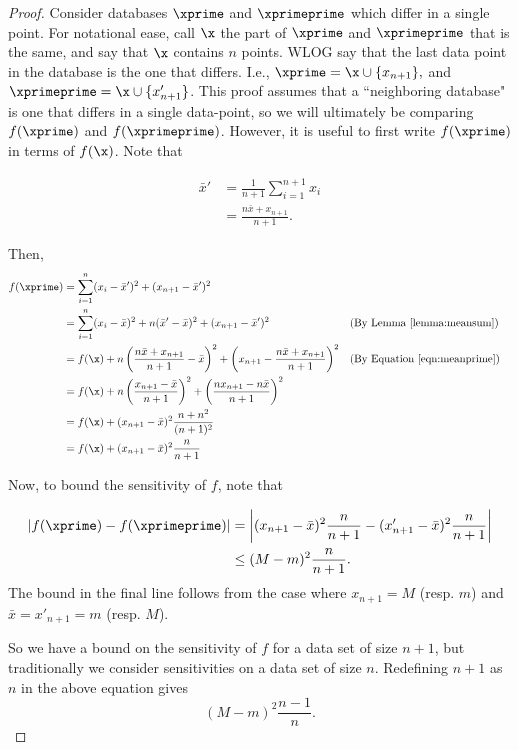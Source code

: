 \documentclass[11pt]{scrartcl} %
\begin{document}
\begin{proof}
Consider databases $\xprime$ and $\xprimeprime$ which differ in a single point. For notational ease, call $\x$ the part of $\xprime$ and $\xprimeprime$
that is the same, and say that $\x$ contains $n$ points. WLOG say that the last data point in the database is the one that differs. I.e.,
$\xprime = \x \cup \{x_{n+1}\},$ and $\xprimeprime = \x \cup \{x'_{n+1}\}$. This proof assumes that a ``neighboring database" is one that differs in a single
data-point, so we will ultimately be comparing $f(\xprime)$ and $f(\xprimeprime)$. However, it is useful to first write $f(\xprime)$ in terms of $f(\x)$.
Note that

\begin{align}
\label{eqn:meanprime}
\bar{x}' &= \frac{1}{n+1} \sum_{i=1}^{n+1} x_i \nonumber \\
	&= \frac{n\bar{x} + x_{n+1}}{n+1}.
\end{align}

Then,
\begin{align}
\label{eq:varAddOnePoint}
f(\xprime) &= \sum_{i=1}^n (x_i - \bar{x}')^2 + (x_{n+1} - \bar{x}')^2 \notag\\
	&= \sum_{i=1}^n (x_i - \bar{x})^2 + n(\bar{x}'-\bar{x})^2 + (x_{n+1} - \bar{x}')^2 &&\text{(By Lemma \ref{lemma:meansum})} \notag\\
	&= f(\x) + n\left( \frac{n\bar{x} + x_{n+1}}{n+1}-\bar{x}\right)^2 + \left(x_{n+1} - \frac{n\bar{x} + x_{n+1}}{n+1} \right)^2 &&\text{(By Equation \ref{eqn:meanprime})} \notag\\
	&= f(\x) + n\left(\frac{x_{n+1}-\bar{x}}{n+1}\right)^2 + \left( \frac{nx_{n+1}-n\bar{x}}{n+1}\right)^2 \notag\\
	&= f(\x) + (x_{n+1}-\bar{x})^2 \frac{n+n^2}{(n+1)^2} \notag\\
	&= f(\x) + (x_{n+1}-\bar{x})^2 \frac{n}{n+1} \notag\\
\end{align}

Now, to bound the sensitivity of $f$, note that

\begin{align}
	\label{eq:l1_np1_bound}
\left\vert f(\xprime) - f(\xprimeprime) \right\vert &= \left\vert (x_{n+1}-\bar{x})^2 \frac{n}{n+1} - (x_{n+1}'-\bar{x})^2 \frac{n}{n+1} \right\vert \\
	&\le (M-m)^2 \frac{n}{n+1}. \nonumber
\end{align}
The bound in the final line follows from the case where $x_{n+1} = M$ (resp. $m$) and $\bar{x} = x'_{n+1} = m$ (resp. $M$). \newline

So we have a bound on the sensitivity of $f$ for a data set of size $n+1$, but traditionally we consider sensitivities
on a data set of size $n$.
Redefining $n+1$ as $n$ in the above equation gives
$$ (M-m)^2 \frac{n-1}{n}. $$
\end{proof}
\end{document}
